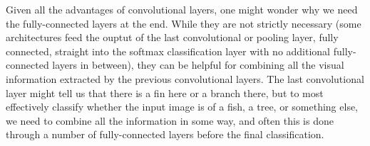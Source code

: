 Given all the advantages of convolutional layers, one might wonder why we need the fully-connected layers at the end. While they are not strictly necessary (some architectures feed the ouptut of the last convolutional or pooling layer, fully connected, straight into the softmax classification layer with no additional fully-connected layers in between), they can be helpful for combining all the visual information extracted by the previous convolutional layers. The last convolutional layer might tell us that there is a fin here or a branch there, but to most effectively classify whether the input image is of a fish, a tree, or something else, we need to combine all the information in some way, and often this is done through a number of fully-connected layers before the final classification.
